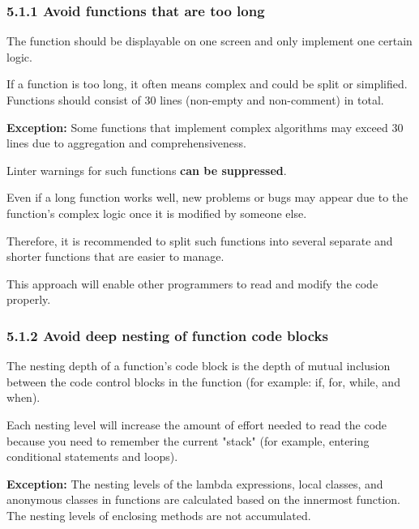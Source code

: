 {{{{\subsubsection*{\textbf{5.1.1 Avoid functions that are too long}}
\leavevmode\newline

\label{sec:5.1.1}



The function should be displayable on one screen and only implement one certain logic.

If a function is too long, it often means complex and could be split or simplified. Functions should consist of 30 lines (non-empty and non-comment) in total.



\textbf{Exception:} Some functions that implement complex algorithms may exceed 30 lines due to aggregation and comprehensiveness.

Linter warnings for such functions \textbf{can be suppressed}. 



Even if a long function works well, new problems or bugs may appear due to the function's complex logic once it is modified by someone else.

Therefore, it is recommended to split such functions into several separate and shorter functions that are easier to manage.

This approach will enable other programmers to read and modify the code properly.

\subsubsection*{\textbf{5.1.2 Avoid deep nesting of function code blocks}}
\leavevmode\newline

\label{sec:5.1.2}



The nesting depth of a function's code block is the depth of mutual inclusion between the code control blocks in the function (for example: if, for, while, and when).

Each nesting level will increase the amount of effort needed to read the code because you need to remember the current "stack" (for example, entering conditional statements and loops). 

\textbf{Exception:} The nesting levels of the lambda expressions, local classes, and anonymous classes in functions are calculated based on the innermost function. The nesting levels of enclosing methods are not accumulated.

}}}}
